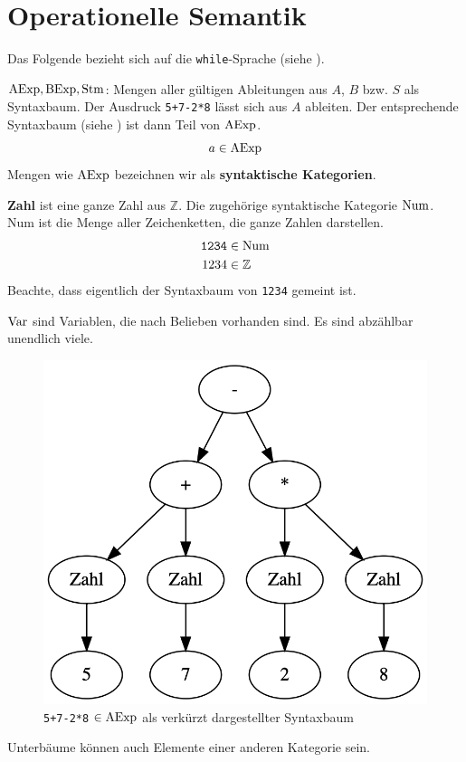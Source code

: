 \section{Operationelle Semantik}

Das Folgende bezieht sich auf die \texttt{while}-Sprache (siehe ).

\begin{definition}
    $\operatorname{AExp}, \operatorname{BExp}, \operatorname{Stm}$: Mengen aller gültigen Ableitungen aus $A$, $B$ bzw. $S$ als Syntaxbaum. Der Ausdruck \texttt{5+7-2*8} lässt sich aus $A$ ableiten. Der entsprechende Syntaxbaum (siehe ) ist dann Teil von $\operatorname{AExp}$.
    \[
    a \in \operatorname{AExp}
    \]
    Mengen wie $\operatorname{AExp}$ bezeichnen wir als \textbf{syntaktische Kategorien}.

    \textbf{Zahl} ist eine ganze Zahl aus $\mathbb{Z}$. Die zugehörige syntaktische Kategorie $\operatorname{Num}$. Num ist die Menge aller Zeichenketten, die ganze Zahlen darstellen.
    \begin{align*}
        \texttt{1234} & \in \operatorname{Num} \\
        1234 & \in \mathbb{Z}
    \end{align*}
    Beachte, dass eigentlich der Syntaxbaum von \texttt{1234} gemeint ist.

    $\operatorname{Var}$ sind Variablen, die nach Belieben vorhanden sind. Es sind abzählbar unendlich viele.
\end{definition}

\begin{figure}[H]
    \centering
    \includegraphics[width=.4\textwidth]{img/syntaxbaum.png}
    \caption{\texttt{5+7-2*8} $\in \operatorname{AExp}$ als verkürzt dargestellter Syntaxbaum}
    \label{fig:syntaxbaum}
\end{figure}

\begin{remark}
    Unterbäume können auch Elemente einer anderen Kategorie sein.
\end{remark}

